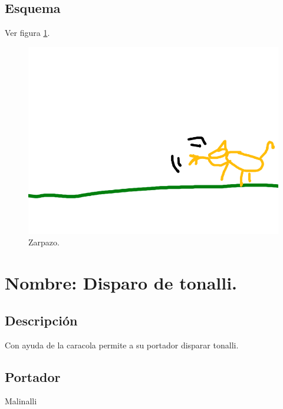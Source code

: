 			\subsection{Esquema}
			Ver figura \ref{fig:zarpazo}.
			\begin{figure}
				\centering
				\includegraphics[height=0.2 \textheight]{Imagenes/zarpazo}
				\caption{Zarpazo.}
				\label{fig:zarpazo}
			\end{figure}
			
\section{Nombre: Disparo de tonalli.}\label{hab.disparoT}
\subsection{Descripción}
Con ayuda de la caracola permite a su portador disparar tonalli.
\subsection{Portador}
Malinalli
